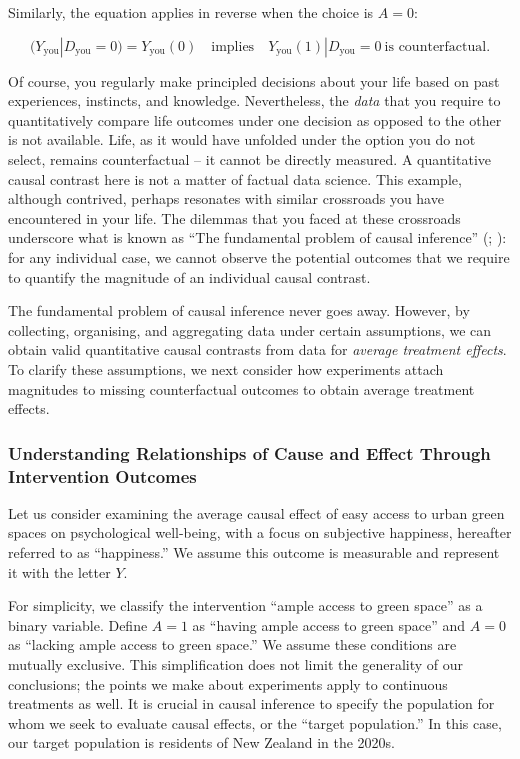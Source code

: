 \documentclass[
  singlecolumn]{article}
\begin{document}
Similarly, the equation applies in reverse when the choice is \(A = 0\):

\[
(Y_{\text{you}}|D_{\text{you}} = 0) = Y_{\text{you}}(0) \quad \text{implies} \quad Y_{\text{you}}(1)|D_{\text{you}} = 0~ \text{is counterfactual}.
\]

Of course, you regularly make principled decisions about your life based
on past experiences, instincts, and knowledge. Nevertheless, the
\emph{data} that you require to quantitatively compare life outcomes
under one decision as opposed to the other is not available. Life, as it
would have unfolded under the option you do not select, remains
counterfactual -- it cannot be directly measured. A quantitative causal
contrast here is not a matter of factual data science. This example,
although contrived, perhaps resonates with similar crossroads you have
encountered in your life. The dilemmas that you faced at these
crossroads underscore what is known as ``The fundamental problem of
causal inference'' (;
): for any individual case, we
cannot observe the potential outcomes that we require to quantify the
magnitude of an individual causal contrast.

The fundamental problem of causal inference never goes away. However, by
collecting, organising, and aggregating data under certain assumptions,
we can obtain valid quantitative causal contrasts from data for
\emph{average treatment effects}. To clarify these assumptions, we next
consider how experiments attach magnitudes to missing counterfactual
outcomes to obtain average treatment effects.

\subsubsection{Understanding Relationships of Cause and Effect Through
Intervention
Outcomes}\label{understanding-relationships-of-cause-and-effect-through-intervention-outcomes}

Let us consider examining the average causal effect of easy access to
urban green spaces on psychological well-being, with a focus on
subjective happiness, hereafter referred to as ``happiness.'' We assume
this outcome is measurable and represent it with the letter \(Y\).

For simplicity, we classify the intervention ``ample access to green
space'' as a binary variable. Define \(A = 1\) as ``having ample access
to green space'' and \(A = 0\) as ``lacking ample access to green
space.'' We assume these conditions are mutually exclusive. This
simplification does not limit the generality of our conclusions; the
points we make about experiments apply to continuous treatments as well.
It is crucial in causal inference to specify the population for whom we
seek to evaluate causal effects, or the ``target population.'' In this
case, our target population is residents of New Zealand in the 2020s.
\end{document}
